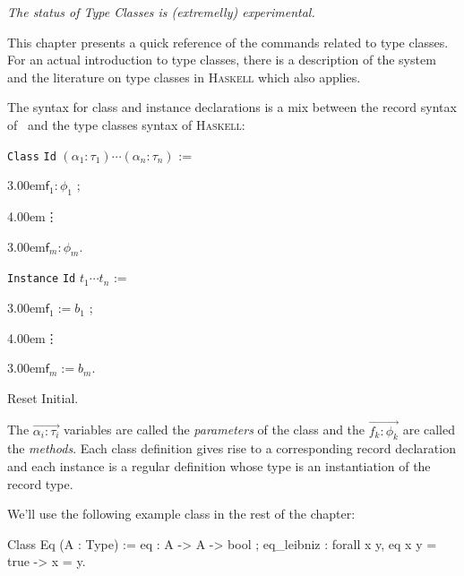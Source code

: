 \def\Haskell{\textsc{Haskell}\xspace}
\def\eol{\setlength\parskip{0pt}\par}
\def\indent#1{\noindent\kern#1}
\def\cst#1{\textsf{#1}}
\def\tele#1{\overrightarrow{#1}}

\label{typeclasses}

\begin{flushleft}
  \em The status of Type Classes is (extremelly) experimental.
\end{flushleft}

This chapter presents a quick reference of the commands related to type
classes. For an actual introduction to type classes, there is a
description of the system \cite{sozeau08} and the literature on type
classes in \Haskell which also applies.

\label{ClassesInstances}

The syntax for class and instance declarations is a mix between the
record syntax of \Coq~and the type classes syntax of \Haskell:
\def\kw{\texttt}
\def\classid{\texttt}

\begin{multicols}{2}{
\medskip
  \kw{Class} \classid{Id} $(\alpha_1 : \tau_1) \cdots (\alpha_n : \tau_n)$ :=
  \eol\indent{3.00em}$\cst{f}_1 : \phi_1$ ;
  \eol\indent{4.00em}\vdots
  \eol\indent{3.00em}$\cst{f}_m : \phi_m$.
\medskip}
{
 
  \medskip
  \kw{Instance} \classid{Id} $t_1 \cdots t_n$ :=
  \eol\indent{3.00em}$\cst{f}_1 := b_1$ ;
  \eol\indent{4.00em}\vdots
  \eol\indent{3.00em}$\cst{f}_m := b_m$.
  \medskip}
\end{multicols}

\begin{coq_eval}
  Reset Initial.
\end{coq_eval}

The $\tele{\alpha_i : \tau_i}$ variables are called the \emph{parameters}
of the class and the $\tele{f_k : \phi_k}$ are called the
\emph{methods}. Each class definition gives rise to a corresponding
record declaration and each instance is a regular definition whose type
is an instantiation of the record type.

We'll use the following example class in the rest of the chapter:

\begin{coq_example*}
Class Eq (A : Type) :=
  eq : A -> A -> bool ;
  eq_leibniz : forall x y, eq x y = true -> x = y.
\end{coq_example*}

